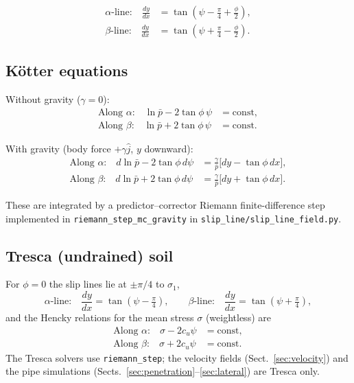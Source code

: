 \documentclass[11pt,a4paper]{article}
\newcommand{\pbar}{\bar{p}}
\newcommand{\tanphi}{\tan\phi}
\begin{document}
\begin{align}
  \text{$\alpha$-line:} \quad
    \frac{dy}{dx} &= \tan\!\left(\psi - \tfrac{\pi}{4} + \tfrac{\phi}{2}\right), \\
  \text{$\beta$-line:} \quad
    \frac{dy}{dx} &= \tan\!\left(\psi + \tfrac{\pi}{4} - \tfrac{\phi}{2}\right).
\end{align}

\subsection{Kötter equations}

Without gravity ($\gamma = 0$):
\begin{align}
  \text{Along $\alpha$:} \quad \ln\pbar - 2\tanphi\,\psi &= \mathrm{const}, \\
  \text{Along $\beta$:} \quad \ln\pbar + 2\tanphi\,\psi &= \mathrm{const}.
\end{align}

With gravity (body force $+\gamma\hat{j}$, $y$ downward):
\begin{align}
  \text{Along $\alpha$:} \quad
    d\ln\pbar - 2\tanphi\,d\psi
    &= \frac{\gamma}{\pbar}\bigl[dy - \tanphi\,dx\bigr], \\
  \text{Along $\beta$:} \quad
    d\ln\pbar + 2\tanphi\,d\psi
    &= \frac{\gamma}{\pbar}\bigl[dy + \tanphi\,dx\bigr].
\end{align}

These are integrated by a predictor–corrector Riemann finite-difference
step implemented in \texttt{riemann\_step\_mc\_gravity} in
\texttt{slip\_line/slip\_line\_field.py}.

\subsection{Tresca (undrained) soil}

For $\phi = 0$ the slip lines lie at $\pm\pi/4$ to $\sigma_1$,
\begin{equation}
  \text{$\alpha$-line:}\quad \frac{dy}{dx} = \tan\!\left(\psi - \tfrac{\pi}{4}\right),
  \qquad
  \text{$\beta$-line:}\quad \frac{dy}{dx} = \tan\!\left(\psi + \tfrac{\pi}{4}\right),
\end{equation}
and the Hencky relations for the mean stress $\sigma$ (weightless) are
\begin{align}
  \text{Along $\alpha$:} \quad \sigma - 2c_u\psi &= \mathrm{const}, \\
  \text{Along $\beta$:} \quad \sigma + 2c_u\psi &= \mathrm{const}.
\end{align}
The Tresca solvers use \texttt{riemann\_step}; the velocity fields
(Sect.~\ref{sec:velocity}) and the pipe simulations
(Sects.~\ref{sec:penetration}–\ref{sec:lateral}) are Tresca only.
\end{document}
